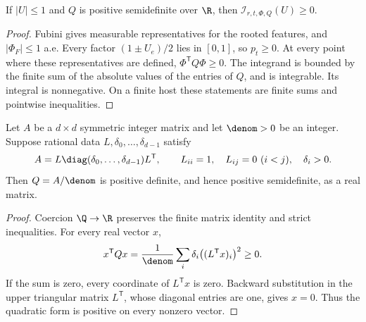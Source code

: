 \begin{lemma}
\label{lem:rooted-positivity}
\proved If $|U|\le1$ and $Q$ is positive semidefinite over $\R$, then
$\mathcal I_{r,t,\Phi,Q}(U)\ge0$.
\end{lemma}
\begin{proof}
Fubini gives measurable representatives for the rooted features, and $|\Phi_F|\le1$ a.e.
Every factor $(1\pm U_e)/2$ lies in $[0,1]$, so $p_t\ge0$.  At every point where these
representatives are defined, $\Phi^{\mathsf T}Q\Phi\ge0$.  The integrand is bounded by the
finite sum of the absolute values of the entries of $Q$, and is integrable.  Its integral is
nonnegative.  On a finite host these statements are finite sums and pointwise inequalities.
\end{proof}

\begin{lemma}
\label{lem:ldl-soundness}
\proved Let $A$ be a $d\times d$ symmetric integer matrix and let $\denom>0$ be an integer.
Suppose rational data $L,\delta_0,\ldots,\delta_{d-1}$ satisfy
\[
 A=L\diag(\delta_0,\ldots,\delta_{d-1})L^{\mathsf T},
 \qquad L_{ii}=1,\quad L_{ij}=0\ (i<j),\quad\delta_i>0.
\]
Then $Q=A/\denom$ is positive definite, and hence positive semidefinite, as a real matrix.
\end{lemma}
\begin{proof}
Coercion $\Q\to\R$ preserves the finite matrix identity and strict inequalities.  For every
real vector $x$,
\[
 x^{\mathsf T}Qx=
 \frac1{\denom}\sum_i\delta_i\bigl((L^{\mathsf T}x)_i\bigr)^2\ge0.
\]
If the sum is zero, every coordinate of $L^{\mathsf T}x$ is zero.  Backward substitution in
the upper triangular matrix $L^{\mathsf T}$, whose diagonal entries are one, gives $x=0$.
Thus the quadratic form is positive on every nonzero vector.
\end{proof}

